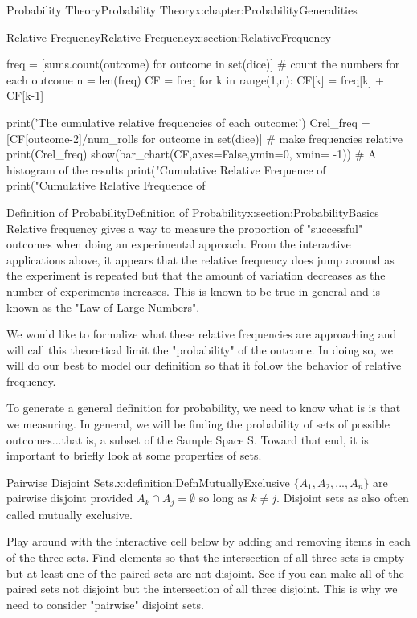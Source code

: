 \documentclass[oneside,10pt,]{book}
\numberwithin{equation}{section}
\begin{document}
\begin{chapterptx}{Probability Theory}{}{Probability Theory}{}{}{x:chapter:ProbabilityGeneralities}
\begin{sectionptx}{Relative Frequency}{}{Relative Frequency}{}{}{x:section:RelativeFrequency}
\begin{sageinput}
    freq = [sums.count(outcome) for outcome in set(dice)]  # count the numbers for each outcome
    n = len(freq)
    CF = freq
    for k in range(1,n):
        CF[k] = freq[k] + CF[k-1]
    
    print('The cumulative relative frequencies of each outcome:')
    Crel_freq = [CF[outcome-2]/num_rolls for outcome in set(dice)]  # make frequencies relative
    print(Crel_freq)        
    show(bar_chart(CF,axes=False,ymin=0, xmin= -1))     #  A histogram of the results
    print("Cumulative Relative Frequence of %
    print("Cumulative Relative Frequence of %
\end{sageinput}
\end{sectionptx}
%
%
\typeout{************************************************}
\typeout{************************************************}
%
\begin{sectionptx}{Definition of Probability}{}{Definition of Probability}{}{}{x:section:ProbabilityBasics}
Relative frequency gives a way to measure the proportion of "successful" outcomes when doing an experimental approach. From the interactive applications above, it appears that the relative frequency does jump around as the experiment is repeated but that the amount of variation decreases as the number of experiments increases. This is known to be true in general and is known as the "Law of Large Numbers".%
\par
We would like to formalize what these relative frequencies are approaching and will call this theoretical limit the "probability" of the outcome. In doing so, we will do our best to model our definition so that it follow the behavior of relative frequency.%
\par
To generate a general definition for probability, we need to know what is is that we measuring. In general, we will be finding the probability of sets of possible outcomes...that is, a subset of the Sample Space S. Toward that end, it is important to briefly look at some properties of sets.%
\begin{definition}{Pairwise Disjoint Sets.}{x:definition:DefnMutuallyExclusive}%
\(\{ A_1, A_2, ... , A_n \}\) are pairwise disjoint provided \(A_k \cap A_j = \emptyset\) so long as \(k \ne j\). Disjoint sets as also often called mutually exclusive.%
\end{definition}
Play around with the interactive cell below by adding and removing items in each of the three sets. Find elements so that the intersection of all three sets is empty but at least one of the paired sets are not disjoint.  See if you can make all of the paired sets not disjoint but the intersection of all three disjoint. This is why we need to consider "pairwise" disjoint sets.%

\end{sectionptx}
\end{chapterptx}
\end{document}
